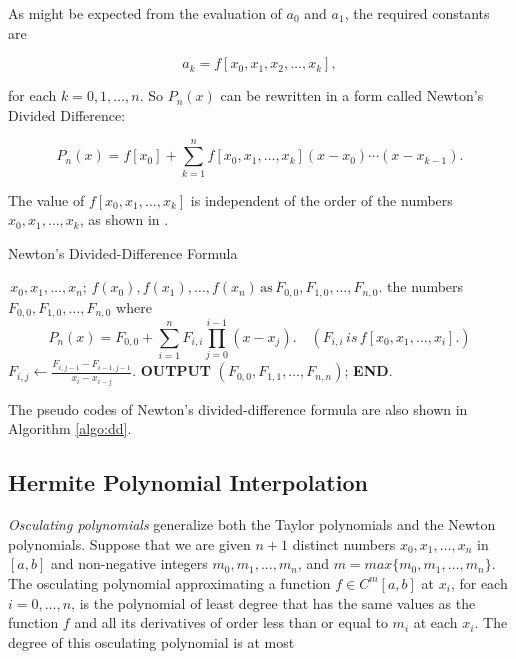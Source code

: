 \documentclass[preprint,12pt]{elsarticle}
\begin{document}
As might be expected from the evaluation of $a_0$ and $a_1$, the required constants are 

$$
a_k = f[x_0,x_1,x_2,\dots,x_k],
$$

for each $k=0,1,\dots,n$. So $P_{n}(x)$ can be rewritten in a form called Newton’s Divided Difference:

\begin{equation}
\label{eq:intro_dd3}
    P_{n}(x)=f[x_0]+\sum_{k=1}^{n} {f[x_0,x_1,\dots,x_k](x-x_0)\cdots(x-x_{k-1})}.
\end{equation}

The value of $f[x_0,x_1,\dots,x_k]$ is independent of the order of the numbers $x_0,x_1,\dots,x_k$, as shown in \cite{burden:2001na}.

\begin{algorithm}
    \caption{Newton's Divided-Difference Formula}
    \label{algo:dd}
    \begin{algorithmic}[1]
    \Require $\,x_0,x_1,\dots,x_n;\,f(x_0),f(x_1),\dots,f(x_n)\,\mathrm{as}\,F_{0,0},F_{1,0},\dots,F_{n,0}$.
    \Ensure the numbers $F_{0,0},F_{1,0},\dots,F_{n,0}$ where
    $$
    P_{n}(x)=F_{0,0}+\sum_{i=1}^{n}{F_{i,i}\prod_{j=0}^{i-1}{(x-x_j)}}.\quad (F_{i,i}\,is\,f[x_0,x_1,\dots,x_i].)
    $$
            \State $F_{i,j} \gets \frac{F_{i,j-1}-F_{i-1,j-1}}{x_{i}-x_{i-j}}.$ 
        \EndFor
    \EndFor
    \State \textbf{OUTPUT} $(F_{0,0},F_{1,1},\dots,F_{n,n})$;
    \State \textbf{END}.
    \end{algorithmic}
\end{algorithm}

The pseudo codes of Newton's divided-difference formula are also shown in Algorithm \ref{algo:dd}.

\subsection{Hermite Polynomial Interpolation}
\label{SS:2.2}

\textit{Osculating polynomials} generalize both the Taylor polynomials and the Newton polynomials. Suppose that we are given $n+1$ distinct numbers $x_0,x_1,\dots,x_n$ in $[a,b]$ and non-negative integers $m_0,m_1,...,m_n$, and $m=max\{m_0,m_1,\dots,m_n\}$. The osculating polynomial approximating a function $f\in C^{m}[a,b]$ at $x_i$, for each $i=0,\dots,n$, is the polynomial of least degree that has the same values as the function $f$ and all its derivatives of order less than or equal to $m_i$ at each $x_i$. The degree of this osculating polynomial is at most
\end{document}

